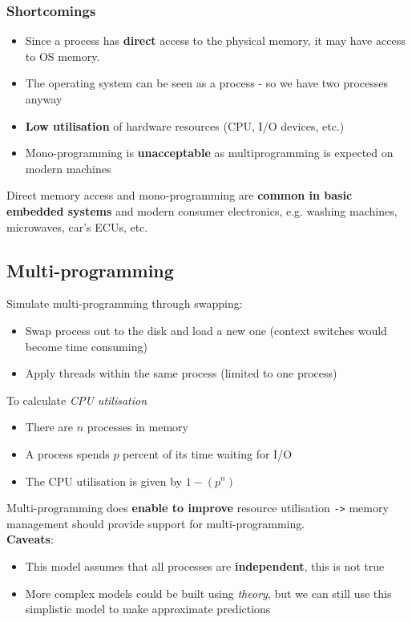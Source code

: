 \documentclass{article}
\begin{document}
\subsubsection{Shortcomings}
\begin{flushleft}
\begin{itemize}
	\item Since a process has \textbf{direct} access to the physical memory, it may have access to OS memory.
	\item The operating system can be seen as a process - so we have two processes anyway
	\item \textbf{Low utilisation} of hardware resources (CPU, I/O devices, etc.)
	\item Mono-programming is \textbf{unacceptable} as multiprogramming is expected on modern machines
\end{itemize}
\bigskip
Direct memory access and mono-programming are \textbf{common in basic embedded systems} and modern consumer electronics, e.g. washing machines, microwaves, car’s ECUs, etc.
\end{flushleft}

\pagebreak
\subsection{Multi-programming}
\begin{flushleft}
Simulate multi-programming through swapping: 
\begin{itemize}
	\item Swap process out to the disk and load a new one (context switches would become time consuming)
	\item Apply threads within the same process (limited to one process)
\end{itemize}
To calculate \textit{CPU utilisation}
\begin{itemize}
	\item There are $n$ processes in memory
	\item A process spends $p$ percent of its time waiting for I/O
	\item The CPU utilisation is given by $ 1 - (p^n) $
\end{itemize}
Multi-programming does \textbf{enable to improve} resource utilisation \verb!->! memory management should provide support for multi-programming.\\
\textbf{Caveats}:\\
\begin{itemize}
	\item This model assumes that all processes are \textbf{independent}, this is not true
	\item More complex models could be built using \textit{theory}, but we can still use this simplistic model to make approximate predictions
\end{itemize}
\end{flushleft}
\end{document}
